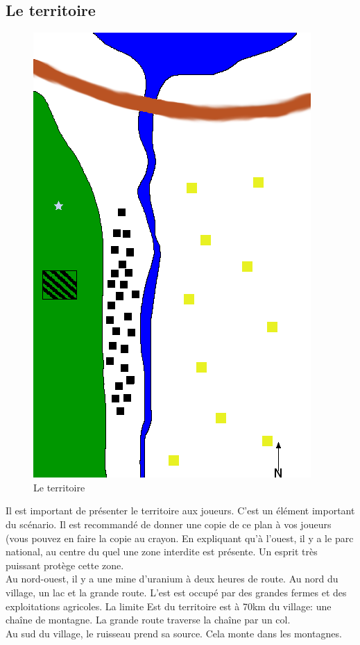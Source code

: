 \documentclass[oneside,12pt]{book}
\begin{document}
\begin{flushleft}
\subsection{Le territoire}
\begin{figure}[!ht]
\caption{\label{territoire} Le territoire}
\includegraphics[scale=0.8]{plan.png}
\end{figure}
Il est important de présenter le territoire aux joueurs.
C'est un élément important du scénario. Il est recommandé de donner une copie de ce plan à vos joueurs (vous pouvez en faire la copie au crayon. En expliquant qu'à l'ouest, il y a le parc national, au centre du quel une zone interdite est présente. Un esprit très puissant protège cette zone.\\
Au nord-ouest, il y a une mine d'uranium à deux heures de route. Au nord du village, un lac et la grande route. L'est est occupé par des grandes fermes et des exploitations agricoles. La limite Est du territoire est à 70km du  village: une chaîne de montagne.  La grande route traverse la chaîne par un col. \\
Au sud du village, le ruisseau prend sa source. Cela monte dans les montagnes. \\


\end{flushleft}
\end{document}
